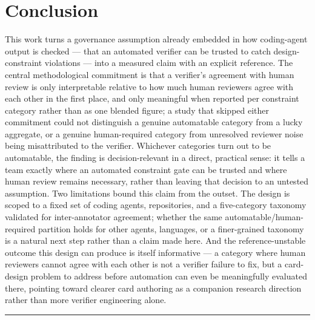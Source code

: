 \documentclass[11pt]{article}
\begin{document}
\section{Conclusion}

This work turns a governance assumption already embedded in how coding-agent output is checked --- that an automated verifier can be trusted to catch design-constraint violations --- into a measured claim with an explicit reference. The central methodological commitment is that a verifier's agreement with human review is only interpretable relative to how much human reviewers agree with each other in the first place, and only meaningful when reported per constraint category rather than as one blended figure; a study that skipped either commitment could not distinguish a genuine automatable category from a lucky aggregate, or a genuine human-required category from unresolved reviewer noise being misattributed to the verifier. Whichever categories turn out to be automatable, the finding is decision-relevant in a direct, practical sense: it tells a team exactly where an automated constraint gate can be trusted and where human review remains necessary, rather than leaving that decision to an untested assumption. Two limitations bound this claim from the outset. The design is scoped to a fixed set of coding agents, repositories, and a five-category taxonomy validated for inter-annotator agreement; whether the same automatable/human-required partition holds for other agents, languages, or a finer-grained taxonomy is a natural next step rather than a claim made here. And the reference-unstable outcome this design can produce is itself informative --- a category where human reviewers cannot agree with each other is not a verifier failure to fix, but a card-design problem to address before automation can even be meaningfully evaluated there, pointing toward clearer card authoring as a companion research direction rather than more verifier engineering alone.

\vspace{1em}
\hrule
\vspace{1em}
\end{document}
